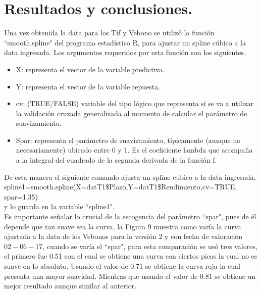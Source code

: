 \chapter{Resultados y conclusiones.}


\hspace{0.4cm} Una vez obtenida la data para los Tif y Vebono se utiliz\'o la funci\'on ``smooth.spline" del programa estad\'istico R, para ajustar un spline c\'ubico a la data ingresada. Los argumentos requeridos por esta funci\'on son los siguientes,

\begin{itemize}
  \item X: representa el vector de la variable predictiva.
  \item Y: representa el vector de la variable repuesta.
  \item cv: (TRUE/FALSE) variable del tipo l\'ogico que representa si se va a utilizar la validaci\'on cruzada generalizada al momento de calcular el par\'ametro de suavizamiento.
  \item Spar: representa el par\'ametro de suavizamiento, t\'ipicamente (aunque no necesariamente) ubicado entre 0 y 1. Es el coeficiente lambda que acompa\~na a la integral del cuadrado de la segunda derivada de la funci\'on f.
\end{itemize}


\hspace{0.4cm} De esta manera el siguiente comando ajusta un spline cubico a la data ingresada,\\

spline1=smooth.spline(X=datT1\$Plazo,Y=datT1\$Rendimiento,cv=TRUE, spar=1.35)\\


\noindent y lo guarda en la variable ``spline1".\\

\hspace{0.4cm} Es importante se\~nalar lo crucial de la escogencia del par\'ametro ``spar", pues de \'el depende que tan suave sea la curva, la Figura 9 muestra como var\'ia la curva ajustada a la data de los Vebonos para la versi\'on 2 y con fecha de valoraci\'on $02-06-17$, cuando se var\'ia el ``spar", para esta comparaci\'on se us\'o tres valores, el primero fue 0.51 con el cual se obtiene una curva con ciertos picos la cual no es suave en lo absoluto. Usando el valor de 0.71 se obtiene la curva roja la cual presenta una mayor suavidad. Mientras que usando el valor de 0.81 se obtiene un mejor resultado aunque similar al anterior.


